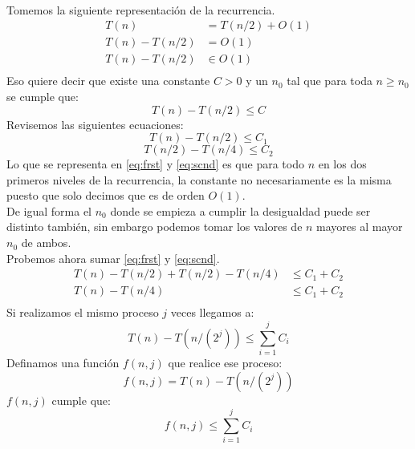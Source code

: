 \documentclass[12pt]{article}
\begin{document}
\paragraph{} Tomemos la siguiente representación de la recurrencia.
\begin{equation}
\begin{split}
T(n) & =T(n/2) + O(1) \\
T(n) - T(n/2) & = O(1) \\
T(n) - T(n/2) & \in O(1) \\
\end{split}
\end{equation}
Eso quiere decir que existe una constante $C>0$ y un $n_0$ tal que para toda  $n\geq n_0$ se cumple que:
 \begin{equation}
	T(n)-T(n/2) \leq C
 \end{equation}
Revisemos las siguientes ecuaciones:
\begin{equation}\label{eq:frst}
T(n)-T(n/2) \leq C_1
\end{equation}
\begin{equation}\label{eq:scnd}
T(n/2)-T(n/4) \leq C_2
\end{equation}
Lo que se representa en \eqref{eq:frst} y \eqref{eq:scnd} es que para todo $n$ en los dos primeros niveles de la recurrencia, la constante no necesariamente es la misma puesto que solo decimos que es de orden $O(1)$.\\
De igual forma el $n_0$ donde se empieza a cumplir la desigualdad puede ser distinto también, sin embargo podemos tomar los valores de $n$ mayores al mayor $n_0$ de ambos.\\
Probemos ahora sumar \eqref{eq:frst} y \eqref{eq:scnd}.
\begin{equation}\label{eq:thrd}
\begin{split}
T(n)-T(n/2) + T(n/2) - T(n/4) & \leq C_1 + C_2 \\
T(n) - T(n/4) & \leq C_1 + C_2 \\
\end{split}
\end{equation}
Si realizamos el mismo proceso $j$ veces llegamos a:
\begin{equation}\label{eq:frth}
T(n)-T(n/(2^j)) \leq \sum_{i=1}^{j}{C_i}
\end{equation}
Definamos una función $f(n,j)$ que realice ese proceso:
\begin{equation}\label{eq:ffth}
f(n,j) = T(n)-T(n/(2^j))
\end{equation}
$f(n,j)$ cumple que:
\begin{equation}\label{eq:sxth}
f(n,j) \leq \sum_{i=1}^{j}{C_i}
\end{equation}
\end{document}

